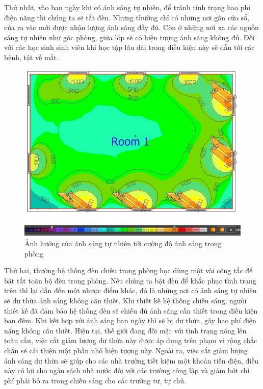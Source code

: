 Thứ nhất, vào ban ngày khi có ánh sáng tự nhiên, để tránh tình trạng hao phí điện năng thì chúng ta sẽ tắt đèn. Nhưng thường chỉ có những nơi gần cửa sổ, cửa ra vào mới được nhận lượng ánh sáng đầy đủ. Còn ở những nơi xa các nguồn sáng tự nhiên như góc phòng, giữa lớp sẽ có hiện tượng ánh sáng không đủ. Đối với các học sinh sinh viên khi học tập lâu dài trong điều kiện này sẽ dẫn tới các bệnh, tật về mắt.
\begin{center}
    \begin{figure}[ht]
    \begin{center}
     \includegraphics[scale=1]{Chapters/Chapter1/Images/Doroi}
    \end{center}
    \caption{Ảnh hưởng của ánh sáng tự nhiên tới cường độ ánh sáng trong phòng}
    \label{fig:doroi}
    \end{figure}
\end{center}

Thứ hai, thường hệ thống đèn chiếu trong phòng học dùng một vài công tắc để bật tắt toàn bộ đèn trong phòng. Nếu chúng ta bật đèn để khắc phục tình trạng trên thì lại dẫn đến một nhược điểm khác, đó là những nơi có ánh sáng tự nhiên sẽ dư thừa ánh sáng không cần thiết. Khi thiết kế hệ thống chiếu sáng, người thiết kế đã đảm bảo hệ thống đèn sẽ chiếu đủ ánh sáng cần thiết trong điều kiện ban đêm. Khi kết hợp với ánh sáng ban ngày thì sẽ bị dư thừa, gây hao phí điện nặng không cần thiết. Hiện tại, thế giới đang đối mặt với tình trạng nóng lên toàn cầu, việc cắt giảm lượng dư thừa này được áp dụng trên phạm vi rộng chắc chắn sẽ cải thiện một phần nhỏ hiện tượng này. Ngoài ra, việc cắt giảm lượng ánh sáng dư thừa sẽ giúp cho các nhà trường tiết kiệm một khoản tiền điện, điều này có lợi cho ngân sách nhà nước đối với các trường công lập và giảm bớt chi phí phải bỏ ra trong chiếu sáng cho các trường tư, tự chủ.

